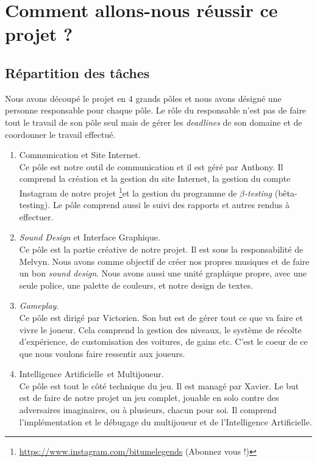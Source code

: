 \documentclass[12pt,a4paper]{article}
\newcommand{\AI}{Intelligence Artificielle}
\begin{document}
\section{Comment allons-nous réussir ce projet ?}
  \subsection{Répartition des tâches} 
    Nous avons découpé le projet en 4 grands pôles et nous avons désigné une personne responsable
    pour chaque pôle. Le rôle du responsable n'est pas de faire tout le travail de son pôle seul mais
    de gérer les \textit{deadlines} de son domaine et de coordonner le travail effectué.\\
    \begin{enumerate}
      \item Communication et Site Internet.\\
        Ce pôle est notre outil de communication et il est géré par Anthony. Il comprend la création
        et la gestion du site Internet, la gestion du compte Instagram de notre projet \footnote{\url{https://www.instagram.com/bitumelegends} (Abonnez vous !)}et la
        gestion du programme de \(\beta\)\textit{-testing} (bêta-testing). Le pôle comprend aussi le suivi
        des rapports et autres rendus à effectuer.
        \\
      \item \textit{Sound Design} et Interface Graphique.\\
        Ce pôle est la partie créative de notre projet. Il est sous la responsabilité de Melvyn.
        Nous avons comme objectif de créer nos propres musiques et de faire un bon \textit{sound design}.
        Nous avons aussi une unité graphique propre, avec une seule police, une palette de couleurs, et notre
        design de textes.
\\
      \item \textit{Gameplay}.\\
        Ce pôle est dirigé par Victorien.
        Son but est de gérer tout ce que va faire et vivre le joueur. Cela comprend la gestion des niveaux,
        le système de récolte d'expérience, de customisation des voitures, de gains etc. C'est le coeur 
        de ce que nous voulons faire ressentir aux joueurs.
        \\
      \item \AI\, et Multijoueur.\\
        Ce pôle est tout le côté technique du jeu. Il est managé par Xavier. Le but est de faire de notre projet
        un jeu complet, jouable en solo contre des adversaires imaginaires, ou à plusieurs, chacun pour soi. Il 
        comprend l'implémentation et le débugage du multijoueur et de l'\AI.
    \end{enumerate}
  \clearpage
\end{document}
